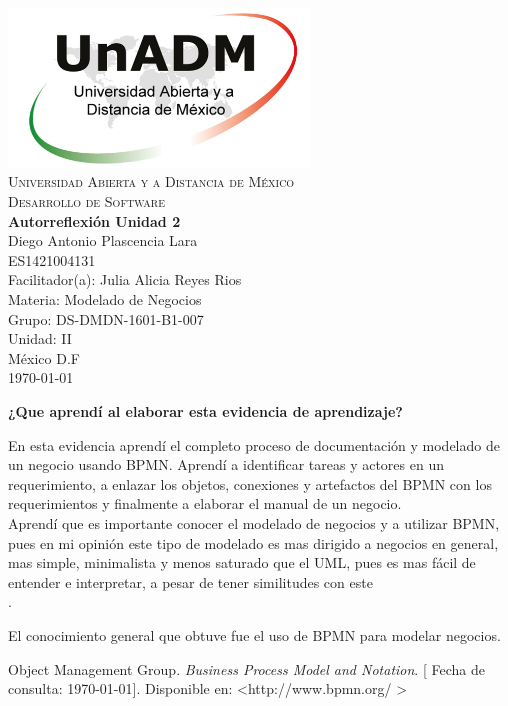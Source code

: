 \documentclass[spanish,12pt,letterpapper]{article}
\begin{document}
	\begin{titlepage}
		\begin{center}
			\includegraphics[width=0.6\textwidth]{../logoUnADM}~\\[1cm] 
			\textsc{Universidad Abierta y a Distancia de México}\\[0.8cm]
			\textsc{Desarrollo de Software}\\[1.8cm]
			
			\textbf{ \Large Autorreflexión Unidad 2}\\[3cm]
			
			Diego Antonio Plascencia Lara\\ ES1421004131 \\[0.4cm]
			Facilitador(a): Julia Alicia Reyes Rios\\
			Materia: Modelado de Negocios\\
			Grupo: DS-DMDN-1601-B1-007 \\
			Unidad: II \\
			
			\vfill México D.F\\{\today}
			
		\end{center}
	\end{titlepage}
	
	\textbf{¿Que aprendí al elaborar esta evidencia de aprendizaje?\\}
	
	En esta evidencia aprendí el completo proceso de documentación y modelado de un negocio usando BPMN. Aprendí a identificar tareas y actores en un requerimiento, a enlazar los objetos, conexiones y artefactos del BPMN con los requerimientos y finalmente a elaborar el manual de un negocio.\\
	
	Aprendí que es importante conocer el modelado de negocios y a utilizar BPMN, pues en mi opinión este tipo de modelado es mas dirigido a negocios en general, mas simple, minimalista y menos saturado que el UML, pues es mas fácil de entender e interpretar, a pesar de tener similitudes con este\\.
	
	El conocimiento general que obtuve fue el uso de BPMN para modelar negocios.
	
	
	
	\pagebreak
	\begin{thebibliography}{9}
	 Object Management Group. 
		\emph{Business Process Model and Notation}. {[} Fecha de consulta: \today {]}. Disponible en: \textless http://www.bpmn.org/ \textgreater	
	\end{thebibliography}
\end{document}
